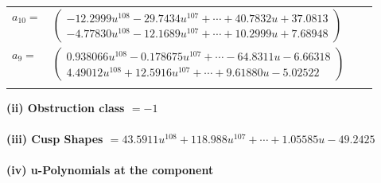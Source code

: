 \documentclass[1p]{elsarticle_modified}
\theoremstyle{definition}
\begin{document}
\begin{tabular}{m{7pt} m{180pt} m{7pt} m{180pt} }
\flushright $a_{10}=$&$\begin{pmatrix}-12.2999 u^{108}-29.7434 u^{107}+\cdots+40.7832 u+37.0813\\-4.77830 u^{108}-12.1689 u^{107}+\cdots+10.2999 u+7.68948\end{pmatrix}$ \\
\flushright $a_{9}=$&$\begin{pmatrix}0.938066 u^{108}-0.178675 u^{107}+\cdots-64.8311 u-6.66318\\4.49012 u^{108}+12.5916 u^{107}+\cdots+9.61880 u-5.02522\end{pmatrix}$\\&\end{tabular}
\flushleft \textbf{(ii) Obstruction class $= -1$}\\~\\
\flushleft \textbf{(iii) Cusp Shapes $= 43.5911 u^{108}+118.988 u^{107}+\cdots+1.05585 u-49.2425$}\\~\\
\newpage\renewcommand{\arraystretch}{1}
\flushleft \textbf{(iv) u-Polynomials at the component}\newline \\
\end{document}
